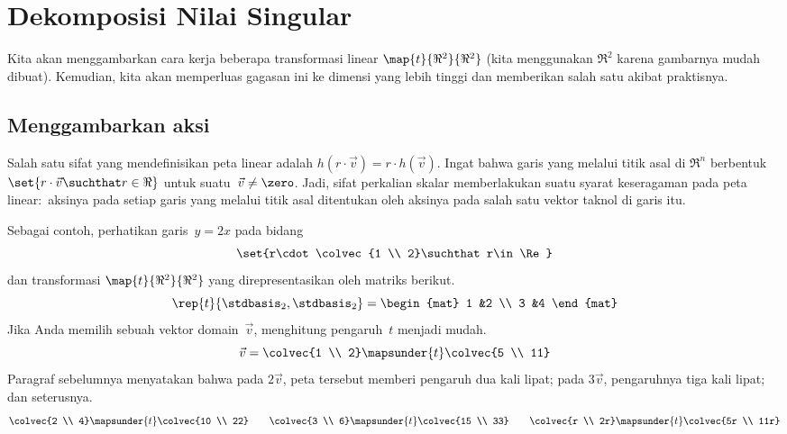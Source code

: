 \chapter{Dekomposisi Nilai Singular}
\label{chap:SingularValueDecomposition}

Kita akan menggambarkan cara kerja beberapa transformasi linear
$\map{t}{\Re^2}{\Re^2}$ (kita menggunakan $\Re^2$ karena gambarnya mudah
dibuat).
Kemudian, kita akan memperluas gagasan ini ke dimensi yang lebih tinggi dan
memberikan salah satu akibat praktisnya.


\section{Menggambarkan aksi}
Salah satu sifat yang mendefinisikan peta linear adalah
$h(r\cdot\vec{v})=r\cdot h(\vec{v})$.
Ingat bahwa garis yang melalui titik asal di $\Re^n$ berbentuk
$\set{r\cdot \vec{v}\suchthat r\in\Re}$ untuk suatu~$\vec{v}\neq\zero$.
Jadi, sifat perkalian skalar memberlakukan suatu syarat keseragaman pada peta
linear:~aksinya pada setiap garis yang melalui titik asal ditentukan oleh
aksinya pada salah satu vektor taknol di garis itu.

Sebagai contoh, perhatikan garis~$y=2x$ pada bidang
\begin{equation*}
  \set{r\cdot\colvec{1 \\ 2}\suchthat r\in\Re}
\end{equation*}
dan transformasi $\map{t}{\Re^2}{\Re^2}$ yang direpresentasikan oleh matriks
berikut.
\begin{equation*}
  \rep{t}{\stdbasis_2,\stdbasis_2}
  =
  \begin{mat}
    1 &2 \\
    3 &4
  \end{mat}
\end{equation*}
Jika Anda memilih sebuah vektor domain~$\vec{v}$, menghitung pengaruh~$t$
menjadi mudah.
\begin{equation*}
  \vec{v}=\colvec{1 \\ 2}\mapsunder{t}\colvec{5 \\ 11}
\end{equation*}
Paragraf sebelumnya menyatakan bahwa pada $2\vec{v}$, peta tersebut memberi
pengaruh dua kali lipat; pada $3\vec{v}$, pengaruhnya tiga kali lipat; dan
seterusnya.
\begin{equation*}
  \colvec{2 \\ 4}\mapsunder{t}\colvec{10 \\ 22}
  \qquad
  \colvec{3 \\ 6}\mapsunder{t}\colvec{15 \\ 33}
  \qquad
  \colvec{r \\ 2r}\mapsunder{t}\colvec{5r \\ 11r}
\end{equation*}

